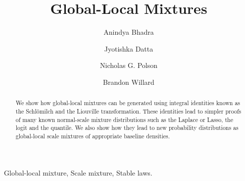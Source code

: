 \documentclass[lineno]{biometrika}
\begin{document}



\title{Global-Local Mixtures}

\author{Anindya Bhadra}
\author{Jyotishka Datta}
\author{Nicholas G. Polson \and Brandon Willard }

\maketitle
\begin{abstract}
\noindent 
We show how global-local mixtures can be generated using integral identities known as the Schl\"omilch and the Liouville transformation. These identities lead to simpler proofs of many known normal-scale mixture distributions such as the Laplace or Lasso, the logit and the quantile. We also show how they lead to new probability distributions as global-local scale mixtures of appropriate baseline densities. 
\end{abstract}

\begin{keywords}
Global-local mixture, Scale mixture, Stable laws.
\end{keywords}
\end{document}
